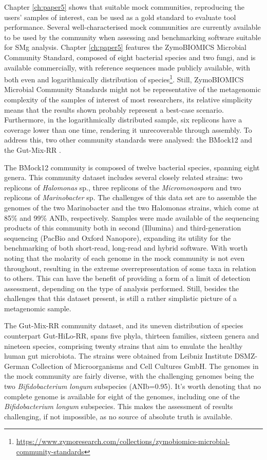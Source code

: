 Chapter \ref{ch:paper5} shows that suitable mock communities, reproducing the users’ samples of interest, can be used as a gold standard to evaluate tool performance. Several well-characterised mock communities are currently available to be used by the community when assessing and benchmarking software suitable for \ac{SMg} analysis. Chapter \ref{ch:paper5} features the ZymoBIOMICS Microbial Community Standard, composed of eight bacterial species and two fungi, and is available commercially, with reference sequences made publicly available, with both even and logarithmically distribution of species\footnote{\url{https://www.zymoresearch.com/collections/zymobiomics-microbial-community-standards}}. Still, ZymoBIOMICS Microbial Community Standards might not be representative of the metagenomic complexity of the samples of interest of most researchers, its relative simplicity means that the results shown probably represent a best-case scenario. Furthermore, in the logarithmically distributed sample, six replicons have a coverage lower than one time, rendering it unrecoverable through assembly. To address this, two other community standards were analysed: the BMock12 \citep{sevim_shotgun_2019} and the Gut-Mix-RR \citep{amos_developing_2020}. 

The BMock12 community is composed of twelve bacterial species, spanning eight genera. This community dataset includes several closely related strains: two replicons of \textit{Halomonas} sp., three replicons of the \textit{Micromonospora} and two replicons of \textit{Marinobacter} sp. The challenges of this data set are to assemble the genomes of the two Marinobacter and the two Halomonas strains, which come at 85\% and 99\% ANIb, respectively. Samples were made available of the sequencing products of this community both in second (Illumina) and third-generation sequencing (PacBio and Oxford Nanopore), expanding its utility for the benchmarking of both short-read, long-read and hybrid software. With worth noting that the molarity of each genome in the mock community is not even throughout, resulting in the extreme overrepresentation of some taxa in relation to others. This can have the benefit of providing a form of a limit of detection assessment, depending on the type of analysis performed. Still, besides the challenges that this dataset present, is still a rather simplistic picture of a metagenomic sample.

The Gut-Mix-RR community dataset, and its uneven distribution of species counterpart Gut-HiLo-RR, spans five phyla, thirteen families, sixteen genera and nineteen species, comprising twenty strains that aim to emulate the healthy human gut microbiota. The strains were obtained from Leibniz Institute DSMZ-German Collection of Microorganisms and Cell Cultures GmbH. The genomes in the mock community are fairly diverse, with the challenging genomes being the two \textit{Bifidobacterium longum} subspecies (ANIb=0.95). It’s worth denoting that no complete genome is available for eight of the genomes, including one of the \textit{Bifidobacterium longum} subspecies. This makes the assessment of results challenging, if not impossible, as no source of absolute truth is available. 

